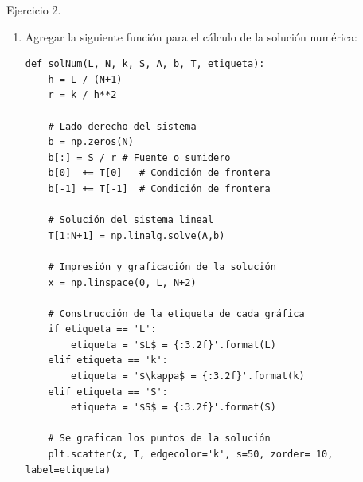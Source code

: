 \documentclass{beamer}
\begin{document}
\begin{frame}[fragile]
	
{\small 
\begin{exampleblock}{Ejercicio 2.}

\begin{enumerate}[b]
\item Agregar la siguiente función para el cálculo de la solución numérica:
\begin{lstlisting}
def solNum(L, N, k, S, A, b, T, etiqueta):
    h = L / (N+1)
    r = k / h**2
    
    # Lado derecho del sistema
    b = np.zeros(N)
    b[:] = S / r # Fuente o sumidero
    b[0]  += T[0]   # Condición de frontera
    b[-1] += T[-1]  # Condición de frontera
    
    # Solución del sistema lineal
    T[1:N+1] = np.linalg.solve(A,b)
    
    # Impresión y graficación de la solución
    x = np.linspace(0, L, N+2)
    
    # Construcción de la etiqueta de cada gráfica
    if etiqueta == 'L':
        etiqueta = '$L$ = {:3.2f}'.format(L)
    elif etiqueta == 'k':
        etiqueta = '$\kappa$ = {:3.2f}'.format(k)
    elif etiqueta == 'S':
        etiqueta = '$S$ = {:3.2f}'.format(S)
    
    # Se grafican los puntos de la solución
    plt.scatter(x, T, edgecolor='k', s=50, zorder= 10, label=etiqueta)
\end{lstlisting}

\end{enumerate}
\end{exampleblock}
}
\end{frame}
\end{document}
